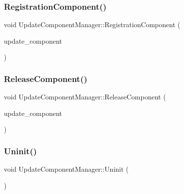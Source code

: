 \subsubsection{\texorpdfstring{Registration\+Component()}{RegistrationComponent()}}
{\footnotesize\ttfamily void Update\+Component\+Manager\+::\+Registration\+Component (\begin{DoxyParamCaption}\item[{\mbox{\hyperlink{class_update_component}{Update\+Component}} $\ast$}]{update\+\_\+component }\end{DoxyParamCaption})\hspace{0.3cm}{\ttfamily [static]}}

\mbox{\label{class_update_component_manager_acc51d246bbe2d5c05c90fd377ec655ef}} 
\subsubsection{\texorpdfstring{Release\+Component()}{ReleaseComponent()}}
{\footnotesize\ttfamily void Update\+Component\+Manager\+::\+Release\+Component (\begin{DoxyParamCaption}\item[{\mbox{\hyperlink{class_update_component}{Update\+Component}} $\ast$}]{update\+\_\+component }\end{DoxyParamCaption})\hspace{0.3cm}{\ttfamily [static]}}

\mbox{\label{class_update_component_manager_acbe5805345fb49ab4c55a36335ea8ed0}} 
\subsubsection{\texorpdfstring{Uninit()}{Uninit()}}
{\footnotesize\ttfamily void Update\+Component\+Manager\+::\+Uninit (\begin{DoxyParamCaption}{ }\end{DoxyParamCaption})\hspace{0.3cm}{\ttfamily [static]}}

